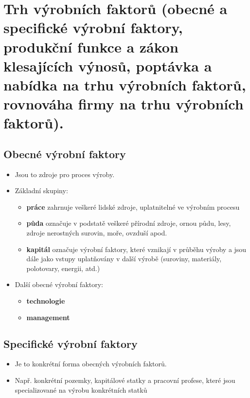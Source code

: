 \clearpage
\section{Trh výrobních faktorů (obecné a specifické výrobní faktory, produkční funkce a zákon
klesajících výnosů, poptávka a nabídka na trhu výrobních faktorů, rovnováha firmy na
trhu výrobních faktorů).}

\subsection{Obecné výrobní faktory}
\begin{itemize}
    \item Jsou to zdroje pro proces výroby.
    \item Základní skupiny:
    \begin{itemize}
        \item \textbf{práce} zahrnuje veškeré lidské zdroje, uplatnitelné ve výrobním procesu
        \item \textbf{půda} označuje v podstatě veškeré přírodní zdroje, ornou půdu, lesy, 
        zdroje nerostných surovin, moře, ovzduší apod.
        \item \textbf{kapitál} označuje výrobní faktory, které vznikají v průběhu výroby a jsou
        dále jako vstupy uplatňovány v další výrobě (suroviny, materiály, polotovary, energii, atd.)
    \end{itemize}
    \item Další obecné výrobní faktory:
    \begin{itemize}
        \item \textbf{technologie}
        \item \textbf{management}
    \end{itemize}
\end{itemize}

\subsection{Specifické výrobní faktory}
\begin{itemize}
    \item Je to konkrétní forma obecných výrobních faktorů.
    \item Např. konkrétní pozemky, kapitálové statky a pracovní profese, které jsou specializované 
    na výrobu konkrétních statků
\end{itemize}


